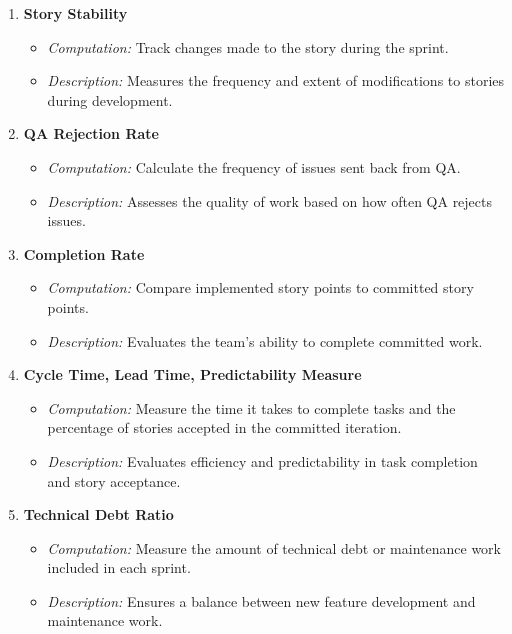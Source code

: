 \begin{enumerate}
    \item \textbf{Story Stability}
    \begin{itemize}
        \item \textit{Computation:} Track changes made to the story during the sprint.
        \item \textit{Description:} Measures the frequency and extent of modifications to stories during development.
    \end{itemize}

    \item \textbf{QA Rejection Rate}
    \begin{itemize}
        \item \textit{Computation:} Calculate the frequency of issues sent back from QA.
        \item \textit{Description:} Assesses the quality of work based on how often QA rejects issues.
    \end{itemize}

    \item \textbf{Completion Rate}
    \begin{itemize}
        \item \textit{Computation:} Compare implemented story points to committed story points.
        \item \textit{Description:} Evaluates the team’s ability to complete committed work.
    \end{itemize}

    \item \textbf{Cycle Time, Lead Time, Predictability Measure}
    \begin{itemize}
        \item \textit{Computation:} Measure the time it takes to complete tasks and the percentage of stories accepted in the committed iteration.
        \item \textit{Description:} Evaluates efficiency and predictability in task completion and story acceptance.
    \end{itemize}

    \item \textbf{Technical Debt Ratio}
    \begin{itemize}
        \item \textit{Computation:} Measure the amount of technical debt or maintenance work included in each sprint.
        \item \textit{Description:} Ensures a balance between new feature development and maintenance work.
    \end{itemize}


\end{enumerate}

